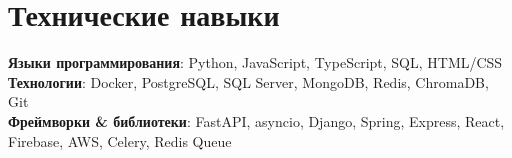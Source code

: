 \documentclass[letterpaper,11pt]{article}
\makeatletter
\newcommand{\resumeSubheading}[5]{
  \vspace{-2pt}\item
    \begin{tabular*}{0.97\textwidth}[t]{l@{\extracolsep{\fill}}r}
      \textbf{#1} & #2 \\
      \textit{\small#3} & \textit{\small #4} \\
      \small#5
    \end{tabular*}\vspace{-7pt}
}
\newcommand{\resumeSubHeadingListStart}{\begin{itemize}[leftmargin=0.15in, label={}]}
\newcommand{\resumeSubHeadingListEnd}{\end{itemize}}
\makeatother
\begin{document}
%

\section{Технические навыки}
 \begin{itemize}[leftmargin=0.15in, label={}]
    \small{\item{
     \textbf{Языки программирования}{: Python, JavaScript, TypeScript, SQL, HTML/CSS} \\
     \textbf{Технологии}{: Docker, PostgreSQL, SQL Server, MongoDB, Redis, ChromaDB, Git} \\
     \textbf{Фреймворки \& библиотеки}{: FastAPI, asyncio, Django, Spring, Express, React, Firebase, AWS, Celery, Redis Queue}
    }}
 \end{itemize}




  
\end{document}
